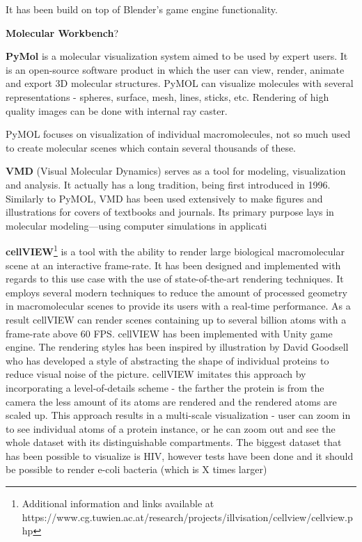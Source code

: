 \documentclass[
  digital, %
  table,   %
  nolof,     %
  nolot,     %
]{fithesis3}
\begin{document}
It has been build on top of Blender's game engine functionality.

\textbf{Molecular Workbench}?

\textbf{PyMol}\cite{PyMOL} is a molecular visualization system aimed to be used by expert users. It is an open-source software product in which the user can view, render, animate and export 3D molecular structures. PyMOL can visualize molecules with several representations - spheres, surface, mesh, lines, sticks, etc. Rendering of high quality images can be done with internal ray caster.

PyMOL focuses on visualization of individual macromolecules, not so much used to create molecular scenes which contain several thousands of these.

\textbf{VMD} (Visual Molecular Dynamics)\cite{HUMP96} serves as a tool for modeling, visualization and analysis. It actually has a long tradition, being first introduced in 1996. Similarly to PyMOL, VMD has been used extensively to make figures and illustrations for covers of textbooks and journals. Its primary purpose lays in molecular modeling—using computer simulations in applicati

\textbf{cellVIEW}\footnote{Additional information and links available at https://www.cg.tuwien.ac.at/research/projects/illvisation/cellview/cellview.php}\cite{cellVIEW_2015} is a tool with the ability to render large biological macromolecular scene at an interactive frame-rate. It has been designed and implemented with regards to this use case with the use of state-of-the-art rendering techniques. It employs several modern techniques to reduce the amount of processed geometry in macromolecular scenes to provide its users with a real-time performance. As a result cellVIEW can render scenes containing up to several billion atoms with a frame-rate above 60 FPS. cellVIEW has been implemented with Unity game engine. The rendering styles has been inspired by illustration by David Goodsell who has developed a style of abstracting the shape of individual proteins to reduce visual noise of the picture. cellVIEW imitates this approach by incorporating a level-of-details scheme - the farther the protein is from the camera the less amount of its atoms are rendered and the rendered atoms are scaled up. This approach results in a multi-scale visualization - user can zoom in to see individual atoms of a protein instance, or he can zoom out and see the whole dataset with its distinguishable compartments. The biggest dataset that has been possible to visualize is HIV, however tests have been done and it should be possible to render e-coli bacteria (which is X times larger)
\end{document}
